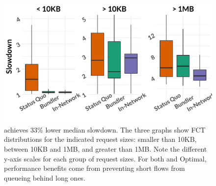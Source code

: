 \begin{figure}
    \centering
\begin{knitrout}
\color{fgcolor}
\includegraphics[width=\maxwidth]{figure/eval:best-1} 

\end{knitrout}
    \caption{\name achieves 33\% lower median slowdown. The three graphs show FCT distributions for the indicated request sizes: smaller than 10KB, between 10KB and 1MB, and greater than 1MB.  Note the different y-axis scales for each group of request sizes. For both \name and Optimal, performance benefits come from preventing short flows from queueing behind long ones.}
    \label{fig:eval:best}
\end{figure}
\newcommand{\overviewBenefitsBaselineMedian}{1.62\xspace}
\newcommand{\overviewBenefitsBaselineTail}{10.77\xspace}
\newcommand{\overviewBenefitsBundlerMedian}{1.08\xspace}
\newcommand{\overviewBenefitsBundlerTail}{9.84\xspace}
\newcommand{\overviewBenefitsOptimalMedian}{1.08\xspace}
\newcommand{\overviewBenefitsOptimalTail}{4.46\xspace}
\newcommand{\overviewBenefitsBundlerMedianImprovement}{33\%\xspace}
